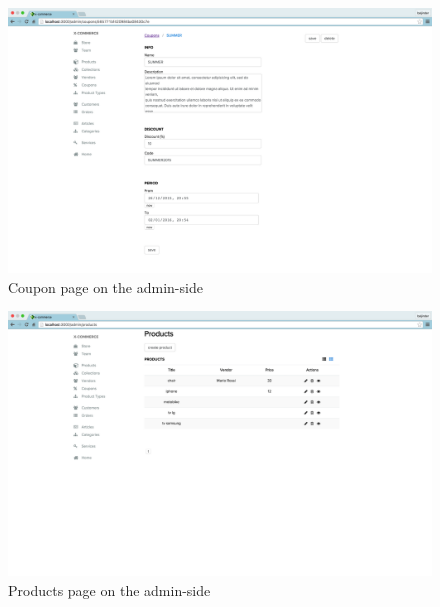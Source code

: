 \begin{figure}[htb]
\centering
\includegraphics[width=1.0\linewidth]{images/chapter4/page-coupon-all.png}\hfill
\caption[Coupon page on the admin-side]{Coupon page on the admin-side}
\label{fig:page_coupon_admin_side}
\end{figure}
\begin{figure}[htb]
\centering
\includegraphics[width=1.0\linewidth]{images/chapter4/page-products-all.png}\hfill
\caption[Products page on the admin-side]{Products page on the admin-side}
\label{fig:page_products_admin_side}
\end{figure}
